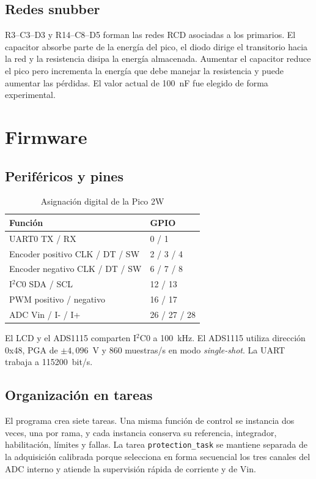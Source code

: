 \documentclass[conference]{IEEEtran}
\begin{document}
\subsection{Redes snubber}

R3--C3--D3 y R14--C8--D5 forman las redes RCD asociadas a los primarios. El capacitor absorbe parte de la energía del pico, el diodo dirige el transitorio hacia la red y la resistencia disipa la energía almacenada. Aumentar el capacitor reduce el pico pero incrementa la energía que debe manejar la resistencia y puede aumentar las pérdidas. El valor actual de 100~nF fue elegido de forma experimental.

\section{Firmware}

\subsection{Periféricos y pines}

\begin{table}[!t]
\caption{Asignación digital de la Pico 2W}
\label{tab:pines}
\centering
\footnotesize
\begin{tabular}{@{}ll@{}}
\toprule
\textbf{Función} & \textbf{GPIO} \\
\midrule
UART0 TX / RX & 0 / 1 \\
Encoder positivo CLK / DT / SW & 2 / 3 / 4 \\
Encoder negativo CLK / DT / SW & 6 / 7 / 8 \\
I$^2$C0 SDA / SCL & 12 / 13 \\
PWM positivo / negativo & 16 / 17 \\
ADC Vin / I- / I+ & 26 / 27 / 28 \\
\bottomrule
\end{tabular}
\end{table}

El LCD y el ADS1115 comparten I$^2$C0 a 100~kHz. El ADS1115 utiliza dirección 0x48, PGA de $\pm4,096$~V y 860 muestras/s en modo \textit{single-shot}. La UART trabaja a 115200~bit/s.

\subsection{Organización en tareas}

El programa crea siete tareas. Una misma función de control se instancia dos veces, una por rama, y cada instancia conserva su referencia, integrador, habilitación, límites y fallas. La tarea \texttt{protection\_task} se mantiene separada de la adquisición calibrada porque selecciona en forma secuencial los tres canales del ADC interno y atiende la supervisión rápida de corriente y de Vin.
\end{document}
